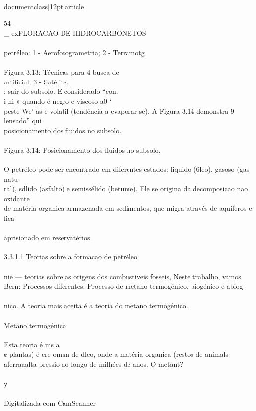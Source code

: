 \\documentclass[12pt]{article}
\begin{document}
54 —\\_ exPLORACAO DE HIDROCARBONETOS\\
\\
petréleo: 1 - Aerofotogrametria; 2 - Terramotg\\
\\
Figura 3.13: Técnicas para 4 busca de\\
artificial; 3 - Satélite.\\
: sair do subsolo. E considerado “con.\\
i ni » quando é negro e viscoso a0 ‘\\
peste We’ as e volatil (tendéncia a evaporar-se). A Figura 3.14 demonstra 9\\
lensado” qui\\
posicionamento dos fluidos no subsolo.\\
\\
Figura 3.14: Posicionamento dos fluidos no subsolo.\\
\\
O petréleo pode ser encontrado em diferentes estados: liquido (6leo), gasoso (gas natu-\\
ral), sdlido (asfalto) e semissélido (betume). Ele se origina da decomposi¢ao nao oxidante\\
de matéria organica armazenada em sedimentos, que migra através de aquiferos e fica\\
\\
aprisionado em reservatérios.\\
\\
3.3.1.1 Teorias sobre a formacao de petréleo\\
\\
nie — teorias sobre as origens dos combustiveis fosseis, Neste trabalho, vamos\\
Bern: Processos diferentes: Processo de metano termogénico, biogénico e abiog\\
\\
nico. A teoria mais aceita é a teoria do metano termogénico.\\
\\
Metano termogénico\\
\\
Esta teoria é ms a\\
¢ plantas) é ere oman de dleo, onde a matéria organica (restos de animals\\
aferraaalta pressio ao longo de milhées de anos. O metant?\\
\\
y\\
\\
Digitalizada com CamScanner\\
\end{document}
